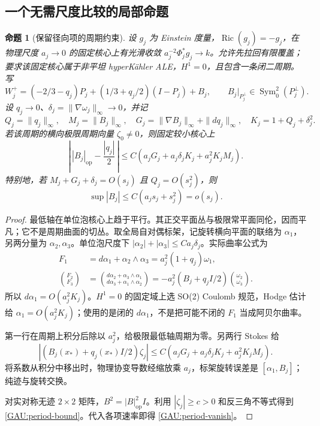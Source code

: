 \documentclass[UTF8,fontset=fandol,zihao=-4,oneside,openany]{ctexbook}
\theoremstyle{cjkplain}
\newtheorem{proposition}[theorem]{命题}
\numberwithin{equation}{chapter}
\begin{document}
\subsection{一个无需尺度比较的局部命题}
\begin{proposition}[保留径向项的周期约束]\label{GAU:period-local}
设 $g_j$ 为 Einstein 度量，$\operatorname{Ric}(g_j)=-g_j$，在物理尺度 $a_j\to0$ 的固定核心上有光滑收敛
$a_j^{-2}\Phi_j^*g_j\to k$。允许先拉回有限覆盖；要求该固定核心属于非平坦 hyperKähler ALE，$H^1=0$，且包含一条闭二周期。写
\begin{equation}\label{GAU:W-block}
W_j^+=(-2/3-q_j)P_j+(1/3+q_j/2)(I-P_j)+B_j,
\qquad B_j|_{P_j^\perp}\in\operatorname{Sym}^2_0(P_j^\perp).
\end{equation}
设 $q_j\to0$、$\delta_j=\|\nabla\omega_j\|_\infty\to0$，并记
\[
Q_j=\|q_j\|_\infty,\quad M_j=\|B_j\|_\infty,\quad
G_j=\|\nabla B_j\|_\infty+\|dq_j\|_\infty,\quad
K_j=1+Q_j+\delta_j^2.
\]
若该周期的横向极限周期向量 $\zeta_0\ne0$，则固定较小核心上
\begin{equation}\label{GAU:period-bound}
\left|\,|B_j|_{\mathrm{op}}-\frac{|q_j|}{2}\,\right|
\le C\left(a_jG_j+a_j\delta_jK_j+a_j^2K_jM_j\right).
\end{equation}
特别地，若 $M_j+G_j+\delta_j=O(s_j)$ 且 $Q_j=O(s_j^2)$，则
\begin{equation}\label{GAU:period-vanish}
\sup|B_j|\le C(a_js_j+s_j^2)=o(s_j).
\end{equation}
\end{proposition}
\begin{proof}
最低轴在单位泡核心上趋于平行。其正交平面丛与极限常平面同伦，因而平凡；它不是周期曲面的切丛。取全局自对偶标架，记旋转横向平面的联络为 $\alpha_1$，另两分量为 $\alpha_2,\alpha_3$。单位泡尺度下
$|\alpha_2|+|\alpha_3|\le Ca_j\delta_j$。实际曲率公式为
\begin{align}\label{GAU:SO3-curvature}
F_1&=d\alpha_1+\alpha_2\wedge\alpha_3
=a_j^2(1+q_j)\omega_1,\\
\binom{F_2}{F_3}&=
\binom{d\alpha_2+\alpha_3\wedge\alpha_1}
{d\alpha_3+\alpha_1\wedge\alpha_2}
=-a_j^2(B_j+q_jI/2)\binom{\omega_2}{\omega_3}.\nonumber
\end{align}
所以 $d\alpha_1=O(a_j^2K_j)$。$H^1=0$ 的固定域上选 SO(2) Coulomb 规范，Hodge 估计给 $\alpha_1=O(a_j^2K_j)$；使用的是闭的 $d\alpha_1$，不是把可能不闭的 $F_1$ 当成阿贝尔曲率。

第一行在周期上积分后除以 $a_j^2$，给极限最低轴周期为零。另两行 Stokes 给
\[
\left|(B_j(x_*)+q_j(x_*)I/2)\zeta_j\right|
\le C(a_jG_j+a_j\delta_jK_j+a_j^2K_jM_j).
\]
将系数从积分中移出时，物理协变导数经缩放乘 $a_j$，标架旋转误差是 $[\alpha_1,B_j]$；纯迹与旋转交换。

对实对称无迹 $2\times2$ 矩阵，$B^2=|B|_{\mathrm{op}}^2I$。利用 $|\zeta_j|\ge c>0$ 和反三角不等式得到 \eqref{GAU:period-bound}。代入各项速率即得 \eqref{GAU:period-vanish}。
\end{proof}
\end{document}
